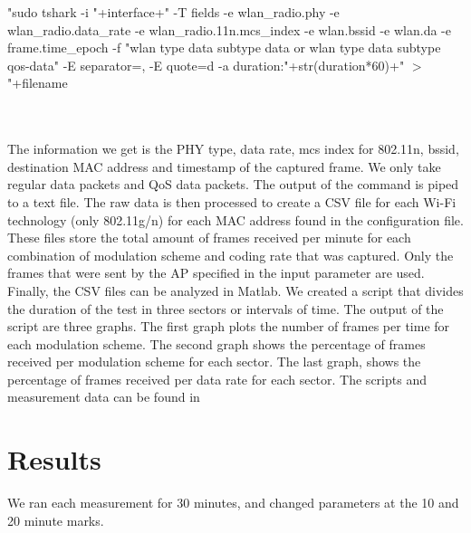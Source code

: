 \documentclass[12]{article}
\begin{document}
\begin{addmargin}[1em]{2em}%
"sudo tshark -i "+interface+" -T fields -e wlan\_radio.phy -e wlan\_radio.data\_rate -e wlan\_radio.11n.mcs\_index -e wlan.bssid -e wlan.da -e frame.time\_epoch -f "wlan type data subtype data or wlan type data subtype qos-data" -E separator=, -E quote=d -a duration:"+str(duration*60)+" $>$ "+filename\\
\end{addmargin}\\\\


The information we get is the PHY type, data rate, mcs index for 802.11n, bssid, destination MAC address and timestamp of the captured frame. We only take regular data packets and QoS data packets. The output of the command is piped to a text file. The raw data is then processed to create a CSV file for each Wi-Fi technology (only 802.11g/n) for each MAC address found in the configuration file. These files store the total amount of frames received per minute for each combination of modulation scheme and coding rate that was captured. Only the frames that were sent by the AP specified in the input parameter are used.\\

Finally, the CSV files can be analyzed in Matlab. We created a script that divides the duration of the test in three sectors or intervals of time. The output of the script are three graphs. The first graph plots the number of frames per time for each modulation scheme. The second graph shows the percentage of frames received per modulation scheme for each sector. The last graph, shows the percentage of frames received per data rate for each sector. The scripts and measurement data can be found in \cite{github}

\section{Results}
We ran each measurement for 30 minutes, and changed parameters at the 10 and 20 minute marks.
\end{document}
